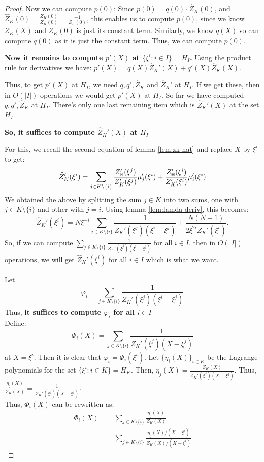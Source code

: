 \begin{proof}
    Now we can compute $p(0)$:
    Since $p(0)=q(0)\cdot \hat{Z}_K(0)$, and
    $\hat{Z}_K(0)=\frac{Z_H(0)}{Z_K(0)}=\frac{-1}{Z_K(0)}$, this enables us to compute $p(0)$,
    since we know $Z_K(X)$ and $Z_K(0)$ is just its constant term.
    Similarly, we know $q(X)$ so can compute $q(0)$ as it is just the constant term.
    Thus, we can compute $p(0)$.

    \textbf{Now it remains to compute $p'(X)$ at $\{\xi^i:i \in I\}=H_I$.}
    Using the  product rule for derivatives we have: $p'(X)=q(X) \hat{Z}_K'(X)+q'(X) \hat{Z}_K(X)$.

    Thus, to get $p'(X)$ at $H_I$, we need $q, q', \hat{Z}_K$ and $\hat{Z}_K'$ at $H_I$.
    If we get these, then in $O(|I|)$ operations we would get $p'(X)$ at $H_I$.
    So far we have computed $q, q', \hat{Z}_K$ at $H_I$. There's only one last remaining item which
    is $\hat{Z}_K'(X)$ at the set $H_I$.

    \textbf{So, it suffices to compute $\hat{Z}_K'(X)$ at $H_I$\\}

    For this, we recall the second equation of lemma \ref{lem:zk-hat} and replace $X$ by $\xi^i$ to get:
    $$  \widehat{Z}_K'(\xi^i) = \sum_{j\in K\setminus \{i\}} \frac{Z_{\mathbb{H}}'(\xi^j)}{Z_K'(\xi^j)}\mu_j'(\xi^i) + \frac{Z_{\mathbb{H}}'(\xi^i)}{Z_K'(\xi^i)}\mu_i'(\xi^i)$$
    We obtained the above by splitting the sum $j \in K$ into two sums, one with $j \in K \setminus \{i\}$ and other with $j=i$.
    Using lemma \ref{lem:lamda-deriv}, this becomes:
    $$ \widehat{Z}_K'(\xi^i)= N\xi^{-i}\sum_{j\in K\setminus \{i\}}\frac{1}{Z_K'(\xi^j)(\xi^i-\xi^j)} + \frac{N(N-1)}{2\xi^{2i}Z_K'(\xi^i)}.$$
    So, if we can compute $\sum_{j\in K\setminus \{i\}}\frac{1}{Z_K'(\xi^j)(\xi^i-\xi^j)}$ for all $i \in I$, then in $O(|I|)$ operations, we will get $\hat{Z}_K'(\xi^i)$ for all $i \in I$ which is what we want.

    Let $$\varphi_i=\sum_{j\in K\setminus \{i\}}\frac{1}{Z_K'(\xi^j)(\xi^i-\xi^j)}$$
    Thus,\textbf{ it suffices to compute $\varphi_i$ for all $i \in I$}\\

    Define:
    $$ \Phi_i(X) = \sum_{j\in K\setminus \{i\}} \frac{1}{Z_K'(\xi^j)(X-\xi^j)} $$
    at $X=\xi^i$. Then it is clear that $\varphi_i=\Phi_i(\xi^i)$.
    Let $\{\eta_i(X)\}_{i\in K}$ be the Lagrange polynomials for the set $\{\xi^i:i\in K\}= H_K$.
    Then, $\eta_j(X)=\frac{Z_K(X)}{Z_K'(\xi^j)(X-\xi^j)}$.
    Thus, $\frac{\eta_j(X)}{Z_K(X)}=\frac{1}{Z_K'(\xi^j)(X-\xi^j)}$.\\
    Thus, $\Phi_i(X)$ can be rewritten as:
    \begin{align*}
        \Phi_i(X)&=\sum_{j\in K\setminus \{i\}} \frac{\eta_j(X)}{Z_K(X)}\\
        &= \sum_{j\in K\setminus \{i\}} \frac{\eta_j(X)/(X-\xi^i)}{Z_K(X)/(X-\xi^i)}
    \end{align*}


\end{proof}
